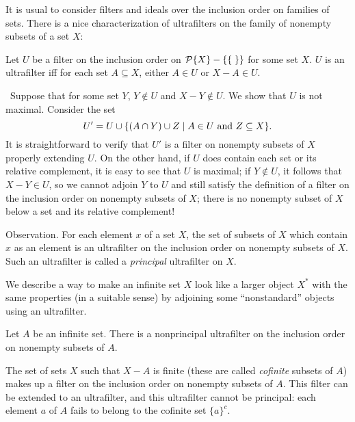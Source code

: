 It is usual to consider filters and ideals over the inclusion
order on families of sets.  There is a nice characterization of
ultrafilters on the family of nonempty subsets
of a set $X$:

\begin{thm}
 Let $U$ be a filter on the inclusion order on ${\cal
 P}\{X\}-\{\mbox{$\{\;\}$}\}$ for some set $X$.  $U$ is an ultrafilter iff for each
 set $A\subseteq X$, either $A \in U$ or $X-A \in U$.
\end{thm}

\preuve\ Suppose that for some set $Y$, $Y \not\in U$ and $X-Y
\not\in U$.  We show that $U$ is not maximal.  Consider the set
$$
 U' =
 U \cup \{(A \cap Y) \cup Z \mid A \in U \mbox{ and } Z \subseteq X\}.
$$
It is straightforward to verify that $U'$ is a filter on nonempty subsets of
$X$ properly extending $U$.  On the other hand, if $U$ does contain
each set or its relative complement, it is easy to
see that $U$ is maximal; if $Y \not\in U$, it follows that $X - Y \in
U$, so we cannot adjoin $Y$ to $U$ and still satisfy the definition of
a filter on the inclusion order on nonempty
subsets of $X$; there is no nonempty subset of $X$ below
a set and its relative complement!
\finpreuve

\begin{ThmEtc}{Observation.} For each element $x$ of a set $X$, the set of
 subsets of $X$ which contain $x$ as an element is an
 ultrafilter on the inclusion order on nonempty
 subsets of $X$.  Such an ultrafilter 
 is called a {\itshape principal\/} ultrafilter on $X$.
\end{ThmEtc}

We describe a way to make an infinite set $X$ look like a larger
object $X^*$ with the same properties (in a suitable sense) by
adjoining some ``nonstandard'' objects using an ultrafilter.

\begin{thm}
 Let $A$ be an infinite set.  There is a nonprincipal
 ultrafilter on the inclusion order on nonempty subsets of
 $A$.
\end{thm}

\preuve The set of sets $X$ such that $X-A$ is finite (these
are called {\itshape cofinite\/} subsets of $A$) makes up a
filter on the inclusion order on nonempty subsets of $A$.  This filter can be
extended to an ultrafilter, and this ultrafilter cannot be
principal: each element $a$ of $A$ fails to belong to the cofinite set
$\{a\}^c$.
\finpreuve

